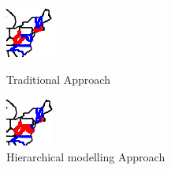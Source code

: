 \documentclass[enabledeprecatedfontcommands,parskip=half,twoside=semi,BCOR=0mm]{scrreprt}
\numberwithin{equation}{chapter}
\theoremstyle{definition}
\theoremstyle{remark}
\begin{document}
    \begin{figure}[h!]
        \centering
        \begin{minipage}[b]{0.45\textwidth}
            \centering
            \includegraphics[width=\textwidth]{Traditional_copy.png}
            \caption{Traditional Approach}
            \label{fig:first}
        \end{minipage}
        \hfill
        \begin{minipage}[b]{0.45\textwidth}
            \centering
            \includegraphics[width=\textwidth]{Hierarchical - Copy.png}
            \caption{Hierarchical modelling Approach}
            \label{fig:second}
        \end{minipage}
    \end{figure}
        
\end{document}
